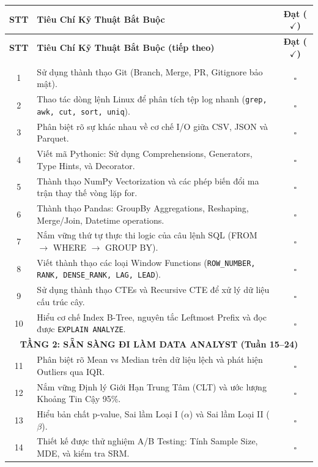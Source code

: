 \begin{longtable}{|c|p{12.5cm}|c|}
\hline
\textbf{STT} & \textbf{Tiêu Chí Kỹ Thuật Bắt Buộc} & \textbf{Đạt ($\checkmark$)} \\
\hline
\endfirsthead
\hline
\textbf{STT} & \textbf{Tiêu Chí Kỹ Thuật Bắt Buộc (tiếp theo)} & \textbf{Đạt ($\checkmark$)} \\
\hline
\endhead
\hline
\endfoot
\hline
\endlastfoot
\multicolumn{3}{|c|}{\textbf{TẦNG 1: NỀN TẢNG BẮT BUỘC (Tuần 1--14)}} \\
\hline
1 & Sử dụng thành thạo Git (Branch, Merge, PR, Gitignore bảo mật). & $\square$ \\
2 & Thao tác dòng lệnh Linux để phân tích tệp log nhanh (\texttt{grep, awk, cut, sort, uniq}). & $\square$ \\
3 & Phân biệt rõ sự khác nhau về cơ chế I/O giữa CSV, JSON và Parquet. & $\square$ \\
4 & Viết mã Pythonic: Sử dụng Comprehensions, Generators, Type Hints, và Decorator. & $\square$ \\
5 & Thành thạo NumPy Vectorization và các phép biến đổi ma trận thay thế vòng lặp for. & $\square$ \\
6 & Thành thạo Pandas: GroupBy Aggregations, Reshaping, Merge/Join, Datetime operations. & $\square$ \\
7 & Nắm vững thứ tự thực thi logic của câu lệnh SQL (FROM $\rightarrow$ WHERE $\rightarrow$ GROUP BY). & $\square$ \\
8 & Viết thành thạo các loại Window Functions (\texttt{ROW\_NUMBER, RANK, DENSE\_RANK, LAG, LEAD}). & $\square$ \\
9 & Sử dụng thành thạo CTEs và Recursive CTE để xử lý dữ liệu cấu trúc cây. & $\square$ \\
10 & Hiểu cơ chế Index B-Tree, nguyên tắc Leftmost Prefix và đọc được \texttt{EXPLAIN ANALYZE}. & $\square$ \\
\hline
\multicolumn{3}{|c|}{\textbf{TẦNG 2: SẴN SÀNG ĐI LÀM DATA ANALYST (Tuần 15--24)}} \\
\hline
11 & Phân biệt rõ Mean vs Median trên dữ liệu lệch và phát hiện Outliers qua IQR. & $\square$ \\
12 & Nắm vững Định lý Giới Hạn Trung Tâm (CLT) và ước lượng Khoảng Tin Cậy 95\%. & $\square$ \\
13 & Hiểu bản chất p-value, Sai lầm Loại I ($\alpha$) và Sai lầm Loại II ($\beta$). & $\square$ \\
14 & Thiết kế được thử nghiệm A/B Testing: Tính Sample Size, MDE, và kiểm tra SRM. & $\square$ \\

\end{longtable}

